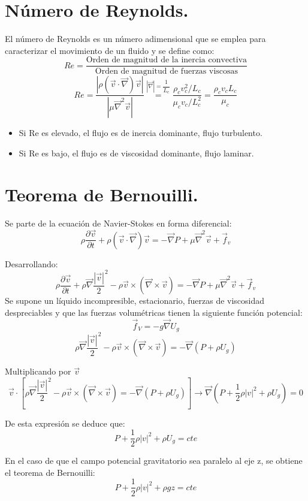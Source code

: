 \section{Número de Reynolds.}
El número de Reynolds es un número adimensional que se emplea para caracterizar el movimiento de un fluido y se define como:
\[Re=\dfrac{\text{Orden de magnitud de la inercia convectiva}}{\text{Orden de magnitud de fuerzas viscosas}}\]
\[Re=\dfrac{|\rho\left(\vec{v}\cdot\vec{\nabla}\right)\vec{v}|}{|\mu\vec{\nabla}^2\vec{v}|}
\stackrel{|\vec{\nabla}|=\dfrac{1}{L_c}}{=}\dfrac{\rho_c v^2_c/L_c}{\mu_c v_c/L^2_c}=\dfrac{\rho_c v_c L_c}{\mu_c}\]
\begin{itemize}
	\item Si Re es elevado, el flujo es de inercia dominante, flujo turbulento.
	\item Si Re es bajo, el flujo es de viscosidad dominante, flujo laminar.
\end{itemize}
\section{Teorema de Bernouilli.}
Se parte de la ecuación de Navier-Stokes en forma diferencial:
\[\rho\dfrac{\partial \vec{v}}{\partial t}+\rho\left(\vec{v}\cdot\vec{\nabla}\right)\vec{v}=-\vec{\nabla}P+\mu\vec{\nabla}^2\vec{v}+ \vec{f}_v\]

Desarrollando:
\[\rho\dfrac{\partial \vec{v}}{\partial t}
+
\rho\vec{\nabla}\dfrac{|\vec{v}|}{2}^2-\rho\vec{v} \times \left(\vec{\nabla}\times\vec{v}\right)
=-\vec{\nabla}P+\mu\vec{\nabla}^2\vec{v}+\vec{f}_v
\]
\newpage
Se supone un líquido incompresible, estacionario, fuerzas de viscosidad despreciables y que las fuerzas volumétricas tienen la siguiente función potencial:
\[\vec{f}_V=-g\vec{\nabla}U_g\]
\[\rho\vec{\nabla}\dfrac{|\vec{v}|}{2}^2
-
\rho\vec{v} \times \left(\vec{\nabla}\times\vec{v}\right)
=
-\vec{\nabla}\left(P+\rho U_g\right)\]

Multiplicando por $\vec{v}$
\[\vec{v}\cdot\left[\rho\vec{\nabla}\dfrac{|\vec{v}|}{2}^2
-
\rho\vec{v} \times \left(\vec{\nabla}\times\vec{v}\right)
=
-\vec{\nabla}\left(P+\rho U_g\right)\right]\rightarrow\vec{\nabla}\left(P+\dfrac{1}{2}\rho|v|^2+\rho U_g\right)=0\]

De esta expresión se deduce que:
\[P+\dfrac{1}{2}\rho|v|^2+\rho U_g=cte\]

En el caso de que el campo potencial gravitatorio sea paralelo al eje z, se obtiene el teorema de Bernouilli:
\[P+\dfrac{1}{2}\rho|v|^2+\rho gz=cte\]